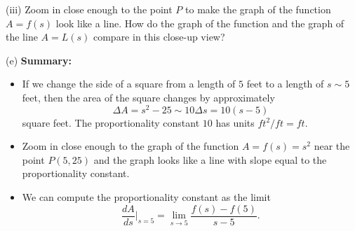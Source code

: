 \documentclass{ximera}
\begin{document}
\begin{question}
(iii) Zoom in close enough to the point $P$ to make the graph of the function $A=f(s)$ look like a line. How do the graph of the function and the graph of the line $A=L(s)$ compare in this close-up view?
\begin{freeResponse}
\end{freeResponse}

(e) {\bf Summary:}
\begin{itemize}
\item{If we change the side of a square from a length of $5$ feet to a length of $s\sim 5$ feet, then the area of the square changes by approximately
\[
 \Delta A = s^2-25  \sim 10 \Delta s = 10 (s-5)
\]
square feet. The proportionality constant $10$ has units $ft^2/ft = ft$.
}

\item{Zoom in close enough to the graph of the function $A=f(s)=s^2$ near the point $P(5,25)$ and the graph looks like a line with slope equal to the proportionality constant.}

\item{We can compute the proportionality constant as the limit
\[
    \frac{dA}{ds}\Big|_{s=5} = \lim_{s\to 5} \frac{f(s)-f(5)}{s-5} . 
\]
}

\end{itemize}



\end{question}
\end{document}
